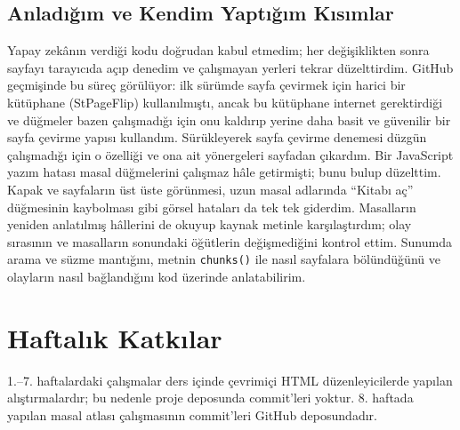\documentclass[12pt,a4paper]{article}
\begin{document}
\subsection{Anladığım ve Kendim Yaptığım Kısımlar}
Yapay zekânın verdiği kodu doğrudan kabul etmedim; her değişiklikten sonra sayfayı
tarayıcıda açıp denedim ve çalışmayan yerleri tekrar düzelttirdim. GitHub geçmişinde bu
süreç görülüyor: ilk sürümde sayfa çevirmek için harici bir kütüphane (StPageFlip)
kullanılmıştı, ancak bu kütüphane internet gerektirdiği ve düğmeler bazen çalışmadığı için
onu kaldırıp yerine daha basit ve güvenilir bir sayfa çevirme yapısı kullandım. Sürükleyerek
sayfa çevirme denemesi düzgün çalışmadığı için o özelliği ve ona ait yönergeleri sayfadan
çıkardım. Bir JavaScript yazım hatası masal düğmelerini çalışmaz hâle getirmişti; bunu
bulup düzelttim. Kapak ve sayfaların üst üste görünmesi, uzun masal adlarında ``Kitabı aç''
düğmesinin kaybolması gibi görsel hataları da tek tek giderdim. Masalların yeniden anlatılmış hâllerini de okuyup kaynak metinle karşılaştırdım; olay
sırasının ve masalların sonundaki öğütlerin değişmediğini kontrol ettim. Sunumda arama ve süzme
mantığını, metnin \texttt{chunks()} ile nasıl sayfalara bölündüğünü ve olayların nasıl
bağlandığını kod üzerinde anlatabilirim.

\section{Haftalık Katkılar}
1.--7. haftalardaki çalışmalar ders içinde çevrimiçi HTML düzenleyicilerde yapılan
alıştırmalardır; bu nedenle proje deposunda commit'leri yoktur. 8. haftada yapılan masal
atlası çalışmasının commit'leri GitHub deposundadır.
\end{document}
